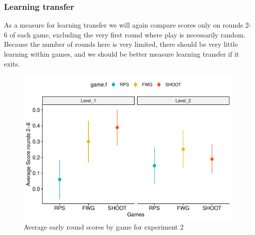 \documentclass[man,floatsintext]{apa6}
\begin{document}
\hypertarget{learning-transfer-1}{%
\subsubsection{Learning transfer}\label{learning-transfer-1}}

As a measure for learning transfer we will again compare scores only on rounds 2-6 of each game, excluding the very first round where play is necessarily random. Because the number of rounds here is very limited, there should be very little learning within games, and we should be better measure learning transfer if it exits.

\begin{figure}

{\centering \includegraphics{draft_report_v1_files/figure-latex/exp2-early-scores-1} 

}

\caption{Average early round scores by game for experiment 2}\label{fig:exp2-early-scores}
\end{figure}
\end{document}
